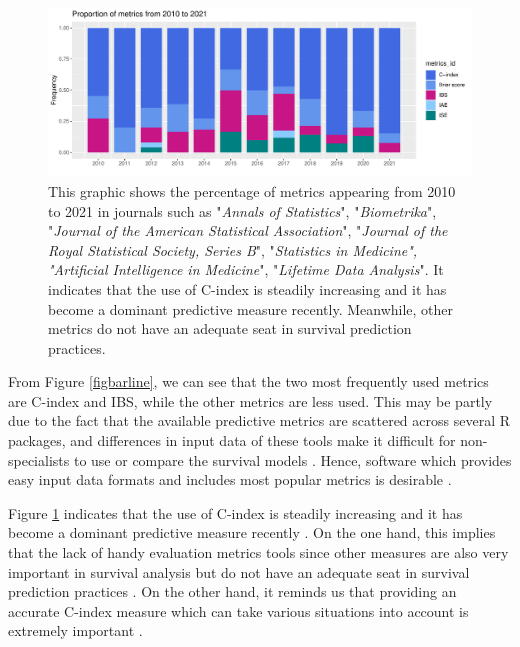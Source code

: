 \begin{figure}[h]
\centering
\begin{center}
\includegraphics[width=\textwidth]{pie.pdf}
\caption{
This graphic shows the percentage of metrics appearing from 2010 to 2021 in journals such as "\emph{Annals of Statistics}", "\emph{Biometrika}", "\emph{Journal of the American Statistical Association}", "\emph{Journal of the Royal Statistical Society, Series B}", "\emph{Statistics in Medicine", "Artificial Intelligence in Medicine}", "\emph{Lifetime Data Analysis}". It indicates that the use of C-index is steadily increasing and it has become a dominant predictive measure recently. Meanwhile, other metrics do not have an adequate seat in survival prediction practices.}\label{figpie}
\end{center}
\end{figure}

From Figure \ref{figbarline}, we can see that the two most frequently used metrics are C-index and IBS, while the other metrics are less used. This may be partly due to the fact that the available predictive metrics are scattered across several R packages, and differences in input data of these tools make it difficult for non-specialists to use or compare the survival models \citep{survcomp.2011, ipred.2009}. Hence, software which provides easy input data formats and includes most popular metrics is desirable \citep{survcomp.2011, Wang.2019}.

Figure \ref{figpie} indicates that the use of C-index is steadily increasing and it has become a dominant predictive measure recently \citep{Jing.2019, Amico.2021}. On the one hand, this implies that the lack of handy evaluation metrics tools since other measures are also very important in survival analysis but do not have an adequate seat in survival prediction practices \citep{Nemati.2021, Li.2021, ensor.2021}. On the other hand, it reminds us that providing an accurate C-index measure which can take various situations into account is extremely important \citep{HEaGerty.2005, Kang.2015, zadeh.2020, zhang.2021}.

